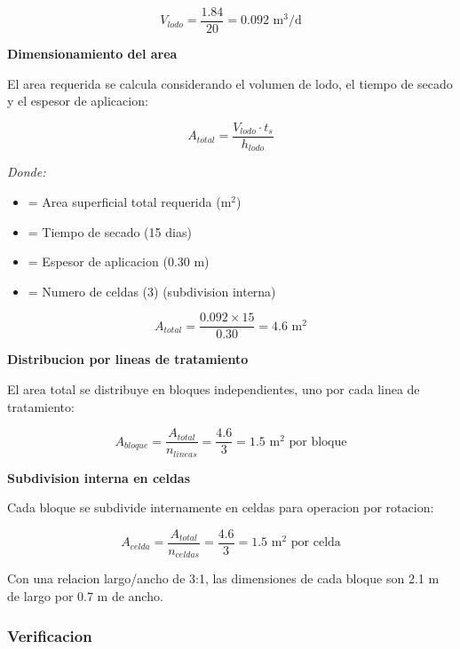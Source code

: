 \documentclass[12pt,a4paper]{article}
\begin{document}
\begin{equation}
V_{lodo} = \frac{1.84}{20} = 0.092 \text{ m}^3\text{/d}
\end{equation}

\textbf{Dimensionamiento del area}

El area requerida se calcula considerando el volumen de lodo, el tiempo de secado y el espesor de aplicacion:

\begin{equation}
A_{total} = \frac{V_{lodo} \cdot t_s}{h_{lodo}}
\end{equation}

\textit{Donde:}
\begin{itemize}[noitemsep,leftmargin=2em]
    \item[$A_{total}$] = Area superficial total requerida (m$^2$)
    \item[$t_s$] = Tiempo de secado (15 dias)
    \item[$h_{lodo}$] = Espesor de aplicacion (0.30 m)
    \item[$n_{celdas}$] = Numero de celdas (3) (subdivision interna)
\end{itemize}

\begin{equation}
A_{total} = \frac{0.092 \times 15}{0.30} = 4.6 \text{ m}^2
\end{equation}

\textbf{Distribucion por lineas de tratamiento}

El area total se distribuye en bloques independientes, uno por cada linea de tratamiento:

\begin{equation}
A_{bloque} = \frac{A_{total}}{n_{lineas}} = \frac{4.6}{3} = 1.5 \text{ m}^2 \text{ por bloque}
\end{equation}

\textbf{Subdivision interna en celdas}

Cada bloque se subdivide internamente en celdas para operacion por rotacion:

\begin{equation}
A_{celda} = \frac{A_{total}}{n_{celdas}} = \frac{4.6}{3} = 1.5 \text{ m}^2 \text{ por celda}
\end{equation}

Con una relacion largo/ancho de 3:1, las dimensiones de cada bloque son 2.1 m de largo por 0.7 m de ancho.

\subsubsection{Verificacion}
\end{document}
